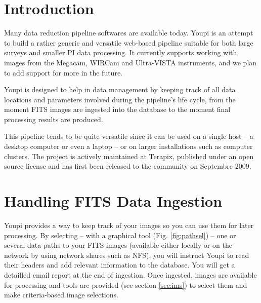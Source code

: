 \documentclass[11pt,twoside]{article}  %
\begin{document}

\section{Introduction}

Many data reduction pipeline softwares are available today. Youpi is an attempt to
build a rather generic and versatile web-based pipeline suitable for both large 
surveys and smaller PI data processing. It currently supports working with images 
from the Megacam, WIRCam and Ultra-VISTA instruments, and we plan to add support 
for more in the future. 

Youpi is designed to help in data management by keeping track of all data locations 
and parameters involved during the pipeline's life cycle, from the moment FITS images 
are ingested into the database to the moment final processing results are produced.

This pipeline tends to be quite versatile since it can be used on a single host -- a 
desktop computer or even a laptop -- or on larger installations such as computer 
clusters. The project is actively maintained at Terapix, published under an open 
source license and has first been released to the community on Septembre 2009.

\section{Handling FITS Data Ingestion}

Youpi provides a way to keep track of your images so you can use them for later 
processing. By selecting -- with a graphical tool (Fig. \ref{fig:pathsel}) -- 
one or several data paths to your FITS images (available either locally or on the 
network by using network shares such as NFS), you will instruct Youpi to read their 
headers and add relevant information to the database. You will get a detailled email 
report at the end of ingestion. Once ingested, images are available for processing 
and tools are provided (see section \ref{sec:ims}) to select them and make criteria-based 
image selections.
\end{document}
